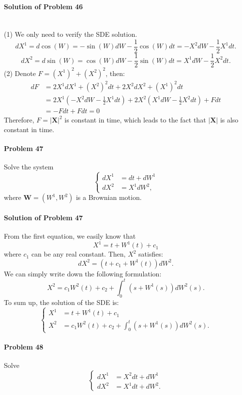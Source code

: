 \documentclass{article}
\begin{document}
\paragraph{Solution of Problem 46} ~\\
(1) We only need to verify the SDE solution. 
\[dX^1 = d\cos(W) = -\sin(W) dW -\frac12 \cos(W) dt = -X^2 dW -\frac12 X^1 dt.\]
\[dX^2 = d\sin(W) = \cos(W) dW -\frac12 \sin(W) dt = X^1 dW - \frac12 X^2 dt.\]
(2) Denote $F = (X^1)^2 + (X^2)^2$, then:
\begin{equation*}
\begin{aligned}
dF &= 2X^1 dX^1 + (X^2)^2 dt + 2X^2 dX^2 + (X^1)^2 dt\\
&= 2X^1(-X^2 dW -\frac12 X^1 dt) + 2X^2(X^1 dW - \frac12 X^2 dt) + Fdt \\
&= -Fdt + Fdt = 0
\end{aligned}    
\end{equation*}
Therefore, $F=|\mathbf{X}|^2$ is constant in time, which leads to the fact that $|\mathbf{X}|$ is also constant in time. 

\paragraph{Problem 47} Solve the system 
\[\begin{cases} dX^1 &= dt+dW^1\\ dX^2 &= X^1 dW^2,\end{cases}\]
where $\mathbf{W}=(W^1, W^2)$ is a Brownian motion. 

\paragraph{Solution of Problem 47} From the first equation, we easily know that 
\[X^1 = t+W^1(t)+c_1\]
where $c_1$ can be any real constant. Then, $X^2$ satisfies:
\[dX^2 = (t+c_1+W^1(t))dW^2.\]
We can simply write down the following formulation:
\[X^2 = c_1W^2(t) + c_2 + \int_{0}^t (s+W^1(s))dW^2(s).\]
To sum up, the solution of the SDE is:
\begin{equation*}
\begin{cases}
X^1 &= t+W^1(t)+c_1\\
X^2 &= c_1 W^2(t) + c_2 + \int_0^t (s+W^1(s))dW^2(s).
\end{cases}    
\end{equation*}

\paragraph{Problem 48} Solve
\begin{equation*}
\begin{cases}
dX^1 &= X^2 dt + dW^1\\
dX^2 &= X^1 dt + dW^2.
\end{cases}    
\end{equation*}
\end{document}
